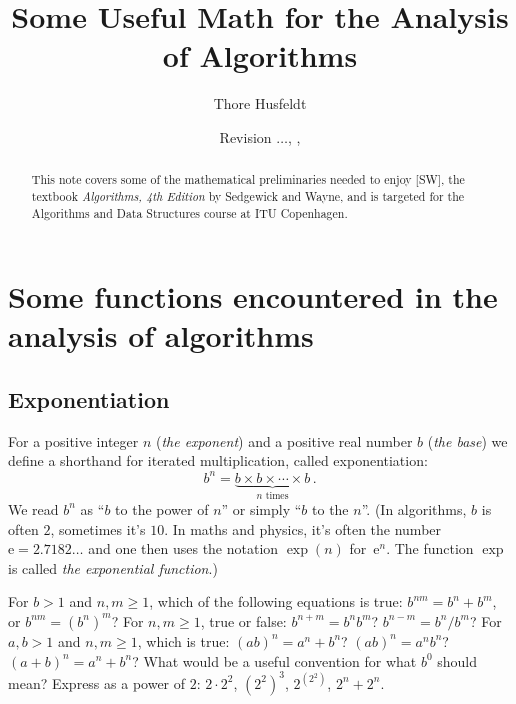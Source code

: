 \documentclass[a4paper,nobib]{tufte-handout}
\title{Some Useful Math for the Analysis of Algorithms}
\author{Thore Husfeldt}
\date{\small Revision {\tt \GITAbrHash}$\ldots$, \GITAuthorDate, \GITAuthorName}
\begin{document}
\maketitle
\begin{abstract}
  This note covers some of the mathematical preliminaries needed to
  enjoy [SW], the textbook \emph{Algorithms, 4th Edition} by Sedgewick and
  Wayne, and is targeted for the Algorithms and Data Structures course at ITU Copenhagen.
\end{abstract}

\section{Some functions encountered in the analysis of algorithms}%

\subsection{Exponentiation}

For a positive integer $n$ (\emph{the exponent}) and a positive real
number $b$ (\emph{the base}) we define a shorthand for iterated
multiplication, called exponentiation:
\[ b^n = \underbrace{b\times b\times \cdots\times b}_{n \text{ times}}\,.\]
We read $b^n$ as ``$b$ to the power of $n$'' or simply ``$b$ to the $n$''.
(In algorithms, $b$ is often $2$, sometimes it's $10$.
In maths and physics, it's often the number $\mathrm e=2.7182\ldots$ and one then uses
the notation $\exp(n)$ for~$\mathrm e^n$. The function $\exp$ is called \emph{the exponential function}.)


\begin{marginfigure}
\end{marginfigure}

\begin{ExerciseList}
\Exercise For $b>1$ and $n,m\geq 1$, which of the following equations is true:
  $b^{nm}=b^n+b^m$, or
  $b^{nm}= {(b^n)}^m$?
\Exercise For $n,m\geq 1$, true or false: 
  $b^{n+m}=b^nb^m$?
  $b^{n-m}=b^n/b^m$?
\Exercise For $a,b>1$ and $n,m\geq 1$, which is true:
  $(ab)^{n}=a^n+b^n$? 
  $(ab)^{n}=a^nb^n$?
  $(a+b)^{n}=a^n+b^n$?
\Exercise What would be a useful convention for what $b^0$ should
mean?
\Exercise Express as a power of $2$: $2\cdot 2^2$, $(2^2)^3$,
$2^{(2^2)}$, $2^n+ 2^n$.
\end{ExerciseList}
\end{document}
